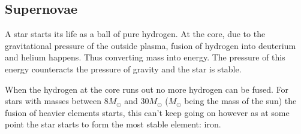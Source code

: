 \subsection{Supernovae}
\label{sec:supernovae}
A star starts its life as a ball of pure hydrogen. At the core, due to the
gravitational pressure of the outside plasma, fusion of hydrogen into deuterium
and helium happens. Thus converting mass into energy. The pressure of this energy
counteracts the pressure of gravity and the star is stable.

When the hydrogen at the core runs out no more hydrogen can be fused. For stars
with masses between $8M_\odot$ and $30M_\odot$ ($M_\odot$ being the mass of the sun)
the fusion of heavier elements starts, this can't keep going on however as at
some point the star starts to form the most stable element: iron. 

